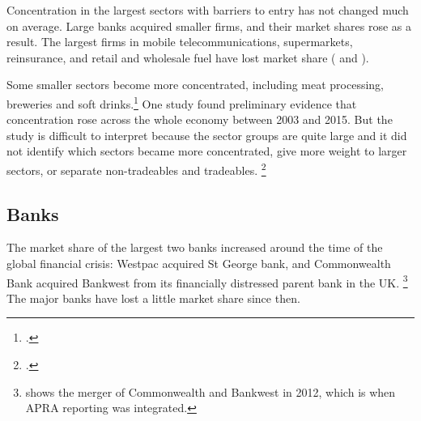 Concentration in the largest sectors with barriers to entry has not changed much on average. Large banks acquired smaller firms, and their market shares rose as a result. The largest firms in mobile telecommunications, supermarkets, reinsurance, and retail and wholesale fuel have lost market share ( and ).

Some smaller sectors become more concentrated, including meat processing, breweries and soft drinks.\footcite{Leigh-2016-Markets&Monopolies} One study found preliminary evidence that concentration rose across the whole economy between 2003 and 2015. But the study is difficult to interpret because the sector groups are quite large and it did not identify which sectors became more concentrated, give more weight to larger sectors, or separate non-tradeables and tradeables.%
  \footcite{Bakhtiari_2017}



\subsection{Banks}
The market share of the largest two banks increased around the time of the global financial crisis: Westpac acquired St George bank, and Commonwealth Bank acquired Bankwest from its financially distressed parent bank in the UK\@.%
\footnote{ shows the merger of Commonwealth and Bankwest in 2012, which is when APRA reporting was integrated.}
The major banks have lost a little market share since then. 

